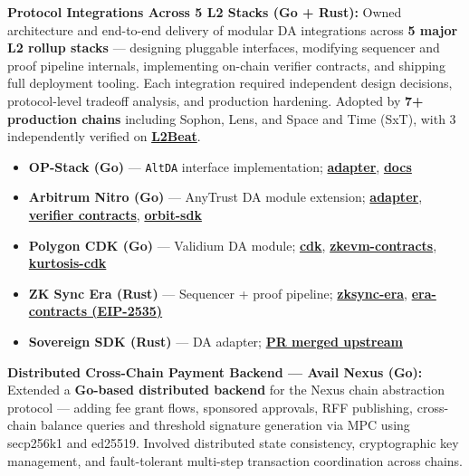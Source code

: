 \documentclass[letterpaper,11pt]{article}
\newcommand{\resumeItem}[1]{
  \item\small{{#1 \vspace{-2pt}}}
}
\begin{document}
    \resumeItem{\textbf{Protocol Integrations Across 5 L2 Stacks (Go + Rust):} Owned architecture and end-to-end delivery of modular DA integrations across \textbf{5 major L2 rollup stacks} — designing pluggable interfaces, modifying sequencer and proof pipeline internals, implementing on-chain verifier contracts, and shipping full deployment tooling. Each integration required independent design decisions, protocol-level tradeoff analysis, and production hardening. Adopted by \textbf{7+ production chains} including Sophon, Lens, and Space and Time (SxT), with 3 independently verified on \href{https://l2beat.com}{\textbf{L2Beat}}.}
    \begin{itemize}
      \item \textbf{OP-Stack (Go)} — \texttt{AltDA} interface implementation; \href{https://github.com/availproject/avail-op-stack-adapter}{\textbf{adapter}}, \href{https://docs.availproject.org/docs/build-with-avail/deploy-rollup-on-avail/Optimium/op-stack/op-stack}{\textbf{docs}}
      \item \textbf{Arbitrum Nitro (Go)} — AnyTrust DA module extension; \href{https://github.com/availproject/avail-nitro-adapter}{\textbf{adapter}}, \href{https://github.com/availproject/nitro-contracts}{\textbf{verifier contracts}}, \href{https://github.com/availproject/arbitrum-orbit-sdk}{\textbf{orbit-sdk}}
      \item \textbf{Polygon CDK (Go)} — Validium DA module; \href{https://github.com/availproject/cdk}{\textbf{cdk}}, \href{https://github.com/availproject/cdk-zkevm-contracts}{\textbf{zkevm-contracts}}, \href{https://github.com/availproject/kurtosis-cdk}{\textbf{kurtosis-cdk}}
      \item \textbf{ZK Sync Era (Rust)} — Sequencer + proof pipeline; \href{https://github.com/availproject/zksync-era}{\textbf{zksync-era}}, \href{https://github.com/availproject/era-contracts}{\textbf{era-contracts (EIP-2535)}}
      \item \textbf{Sovereign SDK (Rust)} — DA adapter; \href{https://github.com/Sovereign-Labs/sovereign-sdk/pull/1709}{\textbf{PR merged upstream}}
    \end{itemize}

    \resumeItem{\textbf{Distributed Cross-Chain Payment Backend — Avail Nexus (Go):} Extended a \textbf{Go-based distributed backend} for the Nexus chain abstraction protocol — adding fee grant flows, sponsored approvals, RFF publishing, cross-chain balance queries and threshold signature generation via MPC using secp256k1 and ed25519. Involved distributed state consistency, cryptographic key management, and fault-tolerant multi-step transaction coordination across chains.}
\end{document}
